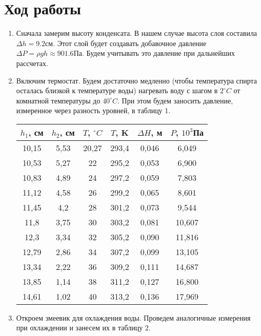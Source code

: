\documentclass[12pt]{article}
\begin{document}
\section{Ход работы}
\begin{enumerate}
\item Сначала замерим высоту конденсата. В нашем случае высота слоя составила $\Delta h = 9.2$см. Этот слой будет создавать добавочное давление $\Delta P= \rho g h \approx 901.6$Па. Будем учитывать это давление при дальнейших рассчетах.
\item Включим термостат. Будем достаточно медленно (чтобы температура спирта осталась близкой к температуре воды) нагревать воду с шагом в $2^\circ C$ от комнатной температуры до $40^\circ C$. При этом будем заносить давление, измеренное через разность уровней, в таблицу 1.
\begin{minipage}{\linewidth}
\centering
{} \label{tab:title} 
\begin{tabular}{|c|c|c|c|c|c|}
\hline 
$h_1$, см & $h_2$, см & $T$, $^\circ C$ & $T$, K & $\Delta H$, м & $P$, $10^3$Па \\ 
\hline 
10,15 & 5,53 & 20,27 & 293,4 & 0,046 & 6,049 \\ 
10,53 & 5,27 & 22 & 295,2 & 0,053 & 6,900 \\ 
10,83 & 4,89 & 24 & 297,2 & 0,059 & 7,803 \\ 
11,12 & 4,58 & 26 & 299,2 & 0,065 & 8,601 \\ 
11,45 & 4,2 & 28 & 301,2 & 0,073 & 9,544 \\ 
11,8 & 3,75 & 30 & 303,2 & 0,081 & 10,607 \\ 
12,3 & 3,34 & 32 & 305,2 & 0,090 & 11,816 \\ 
12,79 & 2,86 & 34 & 307,2 & 0,099 & 13,105 \\ 
13,34 & 2,22 & 36 & 309,2 & 0,111 & 14,687 \\ 
13,85 & 1,14 & 38 & 311,2 & 0,127 & 16,800 \\ 
14,61 & 1,02 & 40 & 313,2 & 0,136 & 17,969 \\ 
\hline 
\end{tabular} 
\end{minipage}
\item Откроем змеевик для охлаждения воды. Проведем аналогичные измерения при охлаждении и занесем их в таблицу 2.


\end{enumerate}
\end{document}
